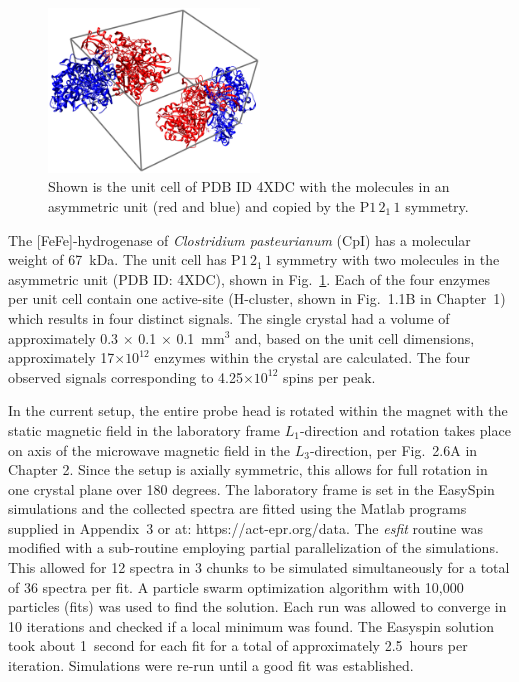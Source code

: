 \begin{figure}[htbp]
\centering
 \includegraphics[width=0.5\textwidth]{Kapitel/Ch6-Images/Ch6-UnitCell.eps}
 \caption[Unit Cell from PDB 4XDC.]{Shown is the unit cell of PDB ID 4XDC with the molecules in an asymmetric unit (red and blue) and copied by the P$1\,2_1\,1$ symmetry.} 
 \label{fig:xTalFeFeUnit}
\end{figure}

The [FeFe]-hydrogenase of {\em Clostridium pasteurianum} (CpI) has a molecular weight of 67~kDa. The unit cell has P$1\,2_1\,1$ symmetry with two molecules in the asymmetric unit (PDB ID: 4XDC), shown in Fig.~\ref{fig:xTalFeFeUnit}. Each of the four enzymes per unit cell contain one active-site (H-cluster, shown in Fig.~1.1B in Chapter~1) which results in four distinct signals. The single crystal had a volume of approximately 0.3 $\times$ 0.1 $\times$ 0.1~mm$^3$ and, based on the unit cell dimensions, approximately 17$\times10^{12}$ enzymes within the crystal are calculated. The four observed signals corresponding to 4.25$\times10^{12}$ spins per peak. 

In the current setup, the entire probe head is rotated within the magnet with the static magnetic field in the laboratory frame $L_1$-direction and rotation takes place on axis of the microwave magnetic field in the $L_3$-direction, per Fig.~2.6A in Chapter 2. Since the setup is axially symmetric, this allows for full rotation in one crystal plane over 180 degrees. The laboratory frame is set in the EasySpin simulations and the collected spectra are fitted using the Matlab programs supplied in Appendix~3 or at: https://act-epr.org/data. The \textit{esfit} routine was modified with a sub-routine employing partial parallelization of the simulations. This allowed for 12 spectra in 3 chunks to be simulated simultaneously for a total of 36 spectra per fit. A particle swarm optimization algorithm with 10,000 particles (fits) was used to find the solution. Each run was allowed to converge in 10 iterations and checked if a local minimum was found. The Easyspin solution took about 1~second for each fit for a total of approximately 2.5~hours per iteration. Simulations were re-run until a good fit was established.

